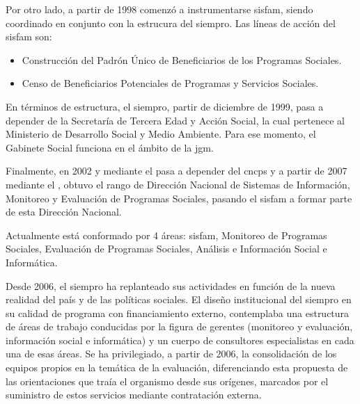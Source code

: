 Por otro lado, a partir de 1998 comenzó a instrumentarse \ac{sisfam}, siendo coordinado en conjunto con la estrucura del \ac{siempro}. Las líneas de acción del \ac{sisfam} son:
    \begin{itemize}
        \item Construcción del Padrón Único de Beneficiarios de los Programas Sociales.
        \item Censo de Beneficiarios Potenciales de Programas y Servicios Sociales.
    \end{itemize}

En términos de estructura, el \ac{siempro}, partir de diciembre de 1999,  pasa a depender de la Secretaría de Tercera Edad y Acción Social, la cual pertenece al Ministerio de Desarrollo Social y Medio Ambiente. Para ese momento, el Gabinete Social funciona en el ámbito de la \ac{jgm}.

Finalmente, en 2002 y mediante el \citeauthor{decreto357} pasa a depender del \ac{cncps} y a partir de 2007 mediante el \citeauthor{decreto78}, obtuvo el rango de Dirección Nacional de Sistemas de Información, Monitoreo y Evaluación de Programas Sociales, pasando el \ac{sisfam} a formar parte de esta Dirección Nacional. 

Actualmente está conformado por 4 áreas: \ac{sisfam}, Monitoreo de Programas Sociales, Evaluación de Programas Sociales, Análisis e Información Social e Informática.


Desde 2006, el \ac{siempro} ha replanteado sus actividades en función de la nueva realidad del país y de las políticas sociales. El diseño institucional del \ac{siempro} en su calidad de programa con financiamiento externo, contemplaba una estructura de áreas de trabajo conducidas por la figura de gerentes (monitoreo y evaluación, información social e informática) y un cuerpo de consultores especialistas en cada una de esas áreas. Se ha privilegiado, a partir de 2006,  la consolidación de los equipos propios en la temática de la evaluación, diferenciando esta propuesta de las orientaciones que traía el organismo desde sus orígenes, marcados por el suministro de estos servicios mediante contratación externa.

